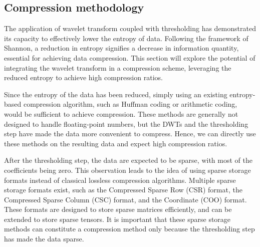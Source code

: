\subsection{Compression methodology} \label{sec:entropy_coding_after_DWT}


The application of wavelet transform coupled with thresholding has demonstrated its capacity to effectively lower the entropy of data.
Following the framework of Shannon, a reduction in entropy signifies a decrease in information quantity, essential for achieving data compression.
This section will explore the potential of integrating the wavelet transform in a compression scheme, leveraging the reduced entropy to achieve high compression ratios.

Since the entropy of the data has been reduced, simply using an existing entropy-based compression algorithm, such as Huffman coding or arithmetic coding, would be sufficient to achieve compression.
These methods are generally not designed to handle floating-point numbers, but the DWTs and the thresholding step have made the data more convenient to compress.
Hence, we can directly use these methods on the resulting data and expect high compression ratios.

After the thresholding step, the data are expected to be sparse, with most of the coefficients being zero.
This observation leads to the idea of using sparse storage formats instead of classical lossless compression algorithms.
Multiple sparse storage formats exist, such as the Compressed Sparse Row (CSR) format, the Compressed Sparse Column (CSC) format, and the Coordinate (COO) format.
These formats are designed to store sparse matrices efficiently, and can be extended to store sparse tensors.
It is important that these sparse storage methods can constitute a compression method only because the thresholding step has made the data sparse.




